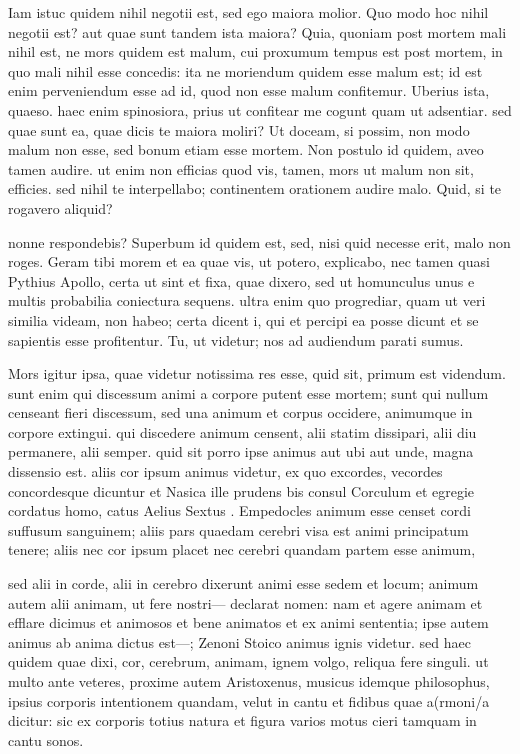  Iam istuc quidem nihil negotii est, sed ego maiora molior. Quo modo hoc nihil negotii est? aut quae sunt tandem ista maiora? Quia, quoniam post mortem mali nihil est, ne mors quidem est malum, cui proxumum tempus est post mortem, in quo mali nihil esse concedis: ita ne moriendum quidem esse malum est; id est enim perveniendum esse ad id, quod non esse malum confitemur. Uberius ista, quaeso. haec enim spinosiora, prius ut confitear me cogunt quam ut adsentiar. sed quae sunt ea, quae dicis te maiora moliri? Ut doceam, si possim, non modo malum non esse, sed bonum etiam esse mortem. Non postulo id quidem, aveo tamen audire. ut enim non efficias quod vis, tamen, mors ut malum non sit, efficies. sed nihil te interpellabo; continentem orationem audire malo. Quid, si te rogavero aliquid?

 nonne respondebis? Superbum id quidem est, sed, nisi quid necesse erit, malo non roges. Geram tibi morem et ea quae vis, ut potero, explicabo, nec tamen quasi Pythius Apollo, certa ut sint et fixa, quae dixero, sed ut homunculus unus e multis probabilia coniectura sequens. ultra enim quo progrediar, quam ut veri similia videam, non habeo; certa dicent i, qui et percipi ea posse dicunt et se sapientis esse profitentur. Tu, ut videtur; nos ad audiendum parati sumus.

 Mors igitur ipsa, quae videtur notissima res esse, quid sit, primum est videndum. sunt enim qui discessum animi a corpore putent esse mortem; sunt qui nullum censeant fieri discessum, sed una animum et corpus occidere, animumque in corpore extingui. qui discedere animum censent, alii statim dissipari, alii diu permanere, alii semper. quid sit porro ipse animus aut ubi aut unde, magna dissensio est. aliis cor ipsum animus videtur, ex quo excordes, vecordes concordesque dicuntur et Nasica ille prudens bis consul Corculum et egregie cordatus homo, catus Aelius Sextus . Empedocles animum esse censet cordi suffusum sanguinem; aliis pars quaedam cerebri visa est animi principatum tenere; aliis nec cor ipsum placet nec cerebri quandam partem esse animum,

 sed alii in corde, alii in cerebro dixerunt animi esse sedem et locum; animum autem alii animam, ut fere nostri— declarat nomen: nam et agere animam et efflare dicimus et animosos et bene animatos et ex animi sententia; ipse autem animus ab anima dictus est—; Zenoni Stoico animus ignis videtur. sed haec quidem quae dixi, cor, cerebrum, animam, ignem volgo, reliqua fere singuli. ut multo ante veteres, proxime autem Aristoxenus, musicus idemque philosophus, ipsius corporis intentionem quandam, velut in cantu et fidibus quae a(rmoni/a dicitur: sic ex corporis totius natura et figura varios motus cieri tamquam in cantu sonos.

